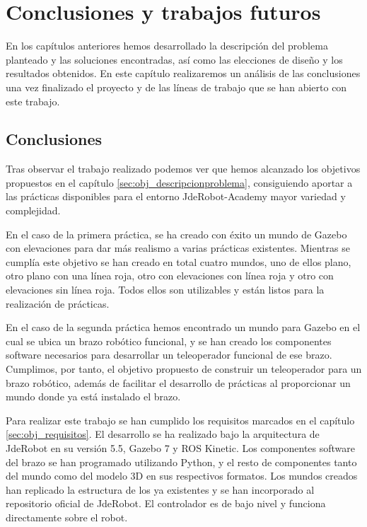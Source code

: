 \chapter{Conclusiones y trabajos futuros}
\label{ch:Conclusiones}

En los capítulos anteriores hemos desarrollado la descripción del problema planteado y las soluciones encontradas, así como las elecciones de diseño y los resultados obtenidos. En este capítulo realizaremos un análisis de las conclusiones una vez finalizado el proyecto y de las líneas de trabajo que se han abierto con este trabajo.

\section{Conclusiones}
\label{sec:cn_conclusiones}

Tras observar el trabajo realizado podemos ver que hemos alcanzado los objetivos propuestos en el capítulo \ref{sec:obj_descripcionproblema}, consiguiendo aportar a las prácticas disponibles para el entorno JdeRobot-Academy mayor variedad y complejidad.

En el caso de la primera práctica, se ha creado con éxito un mundo de Gazebo con elevaciones para dar más realismo a varias prácticas existentes. Mientras se cumplía este objetivo se han creado en total cuatro mundos, uno de ellos plano, otro plano con una línea roja, otro con elevaciones con línea roja y otro con elevaciones sin línea roja. Todos ellos son utilizables y están listos para la realización de prácticas.

En el caso de la segunda práctica hemos encontrado un mundo para Gazebo en el cual se ubica un brazo robótico funcional, y se han creado los componentes software necesarios para desarrollar un teleoperador funcional de ese brazo. Cumplimos, por tanto, el objetivo propuesto de construir un teleoperador para un brazo robótico, además de facilitar el desarrollo de prácticas al proporcionar un mundo donde ya está instalado el brazo.

Para realizar este trabajo se han cumplido los requisitos marcados en el capítulo \ref{sec:obj_requisitos}. El desarrollo se ha realizado bajo la arquitectura de JdeRobot en su versión 5.5, Gazebo 7 y ROS Kinetic. Los componentes software del brazo se han programado utilizando Python, y el resto de componentes tanto del mundo como del modelo 3D en sus respectivos formatos. Los mundos creados han replicado la estructura de los ya existentes y se han incorporado al repositorio oficial de JdeRobot. El controlador es de bajo nivel y funciona directamente sobre el robot.

